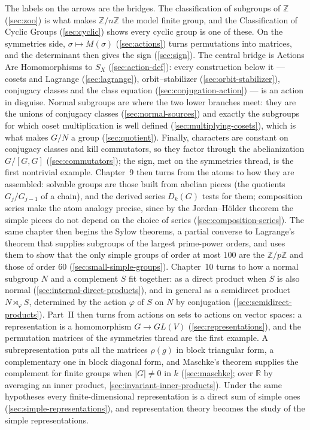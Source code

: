 \documentclass[11pt]{report}
\begin{document}
The labels on the arrows are the bridges. The classification of subgroups of $\mathbb{Z}$ (\ref{sec:zoo}) is what makes $\mathbb{Z}/n\mathbb{Z}$ the model finite group, and the Classification of Cyclic Groups (\ref{sec:cyclic}) shows every cyclic group is one of these. On the symmetries side, $\sigma \mapsto M(\sigma)$ (\ref{sec:actions}) turns permutations into matrices, and the determinant then gives the sign (\ref{sec:sign}). The central bridge is Actions Are Homomorphisms to $S_X$ (\ref{sec:action-def}): every construction below it --- cosets and Lagrange (\ref{sec:lagrange}), orbit--stabilizer (\ref{sec:orbit-stabilizer}), conjugacy classes and the class equation (\ref{sec:conjugation-action}) --- is an action in disguise. Normal subgroups are where the two lower branches meet: they are the unions of conjugacy classes (\ref{sec:normal-sources}) and exactly the subgroups for which coset multiplication is well defined (\ref{sec:multiplying-cosets}), which is what makes $G/N$ a group (\ref{sec:quotient}). Finally, characters are constant on conjugacy classes and kill commutators, so they factor through the abelianization $G/[G,G]$ (\ref{sec:commutators}); the sign, met on the symmetries thread, is the first nontrivial example. Chapter~9 then turns from the atoms to how they are assembled: solvable groups are those built from abelian pieces (the quotients $G_j/G_{j-1}$ of a chain), and the derived series $D_k(G)$ tests for them; composition series make the atom analogy precise, since by the Jordan--H\"older theorem the simple pieces do not depend on the choice of series (\ref{sec:composition-series}). The same chapter then begins the Sylow theorems, a partial converse to Lagrange's theorem that supplies subgroups of the largest prime-power orders, and uses them to show that the only simple groups of order at most $100$ are the $\mathbb{Z}/p\mathbb{Z}$ and those of order $60$ (\ref{sec:small-simple-groups}). Chapter~10 turns to how a normal subgroup $N$ and a complement $S$ fit together: as a direct product when $S$ is also normal (\ref{sec:internal-direct-products}), and in general as a semidirect product $N \rtimes_\varphi S$, determined by the action $\varphi$ of $S$ on $N$ by conjugation (\ref{sec:semidirect-products}). Part~II then turns from actions on sets to actions on vector spaces: a representation is a homomorphism $G \to GL(V)$ (\ref{sec:representations}), and the permutation matrices of the symmetries thread are the first example. A subrepresentation puts all the matrices $\rho(g)$ in block triangular form, a complementary one in block diagonal form, and Maschke's theorem supplies the complement for finite groups when $|G| \neq 0$ in $k$ (\ref{sec:maschke}; over $\mathbb{R}$ by averaging an inner product, \ref{sec:invariant-inner-products}). Under the same hypotheses every finite-dimensional representation is a direct sum of simple ones (\ref{sec:simple-representations}), and representation theory becomes the study of the simple representations.
\end{document}
